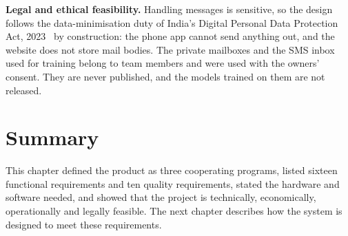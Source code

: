 {\textbf{Legal and ethical feasibility.} Handling messages is sensitive, so the design follows the data-minimisation duty of India's Digital Personal Data Protection Act, 2023~\cite{dpdp2023} by construction: the phone app cannot send anything out, and the website does not store mail bodies. The private mailboxes and the SMS inbox used for training belong to team members and were used with the owners' consent. They are never published, and the models trained on them are not released.

\section{Summary}
This chapter defined the product as three cooperating programs, listed sixteen functional requirements and ten quality requirements, stated the hardware and software needed, and showed that the project is technically, economically, operationally and legally feasible. The next chapter describes how the system is designed to meet these requirements.

}
